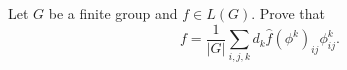 \begin{exercise}
  \label{exe:inversion}
  Let $G$ be a finite group and $f\in L(G)$. Prove that 
  \[
    f=\frac{1}{|G|}\sum_{i,j,k}d_k\widehat{f}(\phi^k)_{ij}\phi_{ij}^k.
  \]
\end{exercise}
  
%

